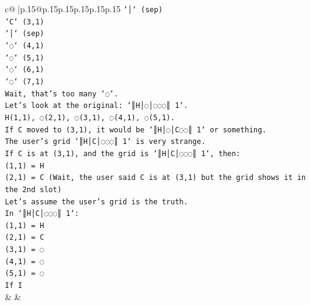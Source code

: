 \documentclass{article}
\begin{document}
{\begin{supertabular}{c@{$\;$}|p{.15\linewidth}@{}p{.15\linewidth}p{.15\linewidth}p{.15\linewidth}p{.15\linewidth}p{.15\linewidth}}
{{{\texttt{`│` (sep)} \\
\texttt{`C` (3,1)} \\
\texttt{`│` (sep)} \\
\texttt{`◌` (4,1)} \\
\texttt{`◌` (5,1)} \\
\texttt{`◌` (6,1)} \\
\texttt{`◌` (7,1)} \\
\texttt{Wait, that's too many `◌`.} \\
\texttt{Let's look at the original: `║H│◌│◌◌◌║ 1`.} \\
\texttt{H(1,1), ◌(2,1), ◌(3,1), ◌(4,1), ◌(5,1).} \\
\texttt{If C moved to (3,1), it would be `║H│◌│C◌◌║ 1` or something.} \\
\texttt{The user's grid `║H│C│◌◌◌║ 1` is very strange.} \\
\texttt{If C is at (3,1), and the grid is `║H│C│◌◌◌║ 1`, then:} \\
\texttt{(1,1) = H} \\
\texttt{(2,1) = C (Wait, the user said C is at (3,1) but the grid shows it in the 2nd slot)} \\
\texttt{Let's assume the user's grid is the truth.} \\
\texttt{In `║H│C│◌◌◌║ 1`:} \\
\texttt{(1,1) = H} \\
\texttt{(2,1) = C} \\
\texttt{(3,1) = ◌} \\
\texttt{(4,1) = ◌} \\
\texttt{(5,1) = ◌} \\
\texttt{If I} \\
            }
        }
    }
    & & \\ \\


\end{supertabular}}
\end{document}
